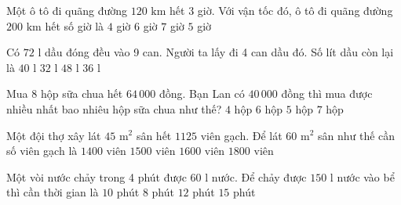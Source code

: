 \begin{ex} %
Một ô tô đi quãng đường $120\text{ km}$ hết $3$ giờ. Với vận tốc đó, ô tô đi quãng đường $200\text{ km}$ hết số giờ là
\choice
{$4$ giờ}
{$6$ giờ}
{$7$ giờ}
{\True $5$ giờ}
\end{ex}

\begin{ex} %
Có $72\text{ l}$ dầu đóng đều vào 9 can. Người ta lấy đi 4 can dầu đó. Số lít dầu còn lại là
\choice
{\True $40\text{ l}$}
{$32\text{ l}$}
{$48\text{ l}$}
{$36\text{ l}$}
\end{ex}

\begin{ex} %
Mua 8 hộp sữa chua hết $64\,000$ đồng. Bạn Lan có $40\,000$ đồng thì mua được nhiều nhất bao nhiêu hộp sữa chua như thế?
\choice
{$4$ hộp}
{$6$ hộp}
{\True $5$ hộp}
{$7$ hộp}
\end{ex}

\begin{ex} %
Một đội thợ xây lát $45\text{ m}^2$ sân hết $1125$ viên gạch. Để lát $60\text{ m}^2$ sân như thế cần số viên gạch là
\choice
{$1400$ viên}
{\True $1500$ viên}
{$1600$ viên}
{$1800$ viên}
\end{ex}

\begin{ex} %
Một vòi nước chảy trong 4 phút được $60\text{ l}$ nước. Để chảy được $150\text{ l}$ nước vào bể thì cần thời gian là
\choice
{\True $10$ phút}
{$8$ phút}
{$12$ phút}
{$15$ phút}
\end{ex}

